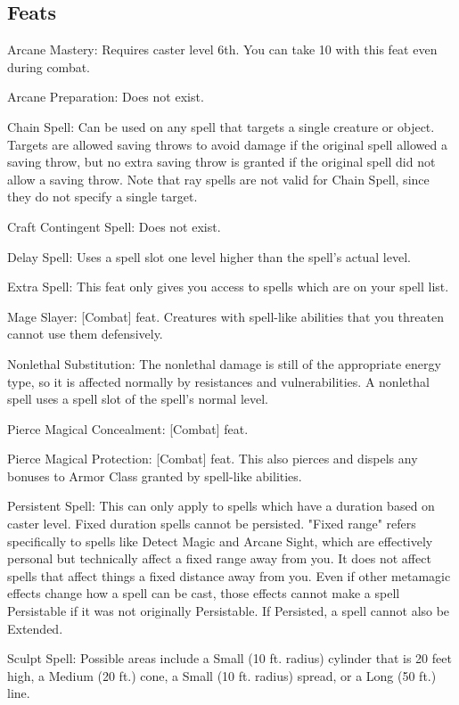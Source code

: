 \subsection{Feats}
\begin{itemize*}
\item Arcane Mastery: Requires caster level 6th. You can take 10 with this feat even during combat.
\item Arcane Preparation: Does not exist.
\item Chain Spell: Can be used on any spell that targets a single creature or object. Targets are allowed saving throws to avoid damage if the original spell allowed a saving throw, but no extra saving throw is granted if the original spell did not allow a saving throw. Note that ray spells are not valid for Chain Spell, since they do not specify a single target.
\item Craft Contingent Spell: Does not exist.
\item Delay Spell: Uses a spell slot one level higher than the spell's actual level.
\item Extra Spell: This feat only gives you access to spells which are on your spell list.
\item Mage Slayer: [Combat] feat. Creatures with spell-like abilities that you threaten cannot use them defensively.
\item Nonlethal Substitution: The nonlethal damage is still of the appropriate energy type, so it is affected normally by resistances and vulnerabilities. A nonlethal spell uses a spell slot of the spell's normal level.
\item Pierce Magical Concealment: [Combat] feat.
\item Pierce Magical Protection: [Combat] feat. This also pierces and dispels any bonuses to Armor Class granted by spell-like abilities.
\item Persistent Spell: This can only apply to spells which have a duration based on caster level. Fixed duration spells cannot be persisted. "Fixed range" refers specifically to spells like Detect Magic and Arcane Sight, which are effectively personal but technically affect a fixed range away from you. It does not affect spells that affect things a fixed distance away from you. Even if other metamagic effects change how a spell can be cast, those effects cannot make a spell Persistable if it was not originally Persistable. If Persisted, a spell cannot also be Extended.
\item Sculpt Spell: Possible areas include a Small (10 ft. radius) cylinder that is 20 feet high, a Medium (20 ft.) cone, a Small (10 ft. radius) spread, or a Long (50 ft.) line.
\end{itemize*}


